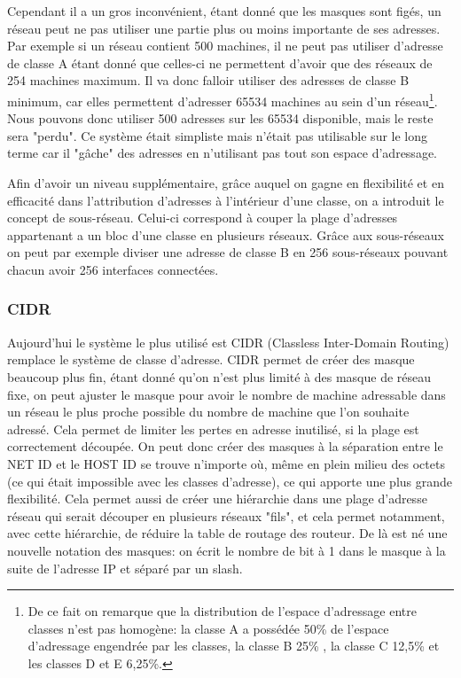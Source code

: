 Cependant il a un gros inconvénient, étant donné que les masques sont
figés, un réseau peut ne pas utiliser une partie plus ou moins importante
de ses adresses. Par exemple si un réseau contient 500 machines, il ne peut pas
utiliser d'adresse de classe A étant donné que celles-ci ne permettent d'avoir
que des réseaux de 254 machines maximum. Il va donc falloir utiliser des
adresses de classe B minimum, car elles permettent d'adresser 65534 machines au
sein d'un réseau\footnote{
De ce fait on remarque que la distribution de l’espace d’adressage entre
classes n'est pas homogène: la classe A a possédée 50\% de l’espace
d'adressage engendrée par les classes, la classe B 25\% , la classe C 12,5\%  et
les classes D et E 6,25\%.}. Nous pouvons donc utiliser 500 adresses sur les 65534
disponible, mais le reste sera "perdu".  Ce système était simpliste mais
n'était pas utilisable sur le long terme car il "gâche" des adresses en
n'utilisant pas tout son espace d'adressage.

Afin d'avoir un niveau supplémentaire, grâce auquel on gagne en flexibilité et
en efficacité dans l'attribution d'adresses à l'intérieur d'une classe, on a
introduit le concept de sous-réseau. Celui-ci correspond à couper la plage
d'adresses appartenant a un bloc d'une classe en plusieurs réseaux. Grâce aux
sous-réseaux on peut par exemple diviser une adresse de classe B en 256
sous-réseaux pouvant chacun avoir 256 interfaces connectées. 


\subsubsection{CIDR}

Aujourd'hui le système le plus utilisé est CIDR (Classless Inter-Domain
Routing) remplace le système de classe d'adresse. CIDR permet de créer des
masque beaucoup plus fin, étant donné qu'on n'est plus limité à des masque de
réseau fixe, on peut ajuster le masque pour avoir le nombre de machine
adressable dans un réseau le plus proche possible du nombre de machine que l'on
souhaite adressé.  Cela permet de limiter les pertes en adresse inutilisé, si
la plage est correctement découpée.  On peut donc créer des masques à la
séparation entre le NET ID et le HOST ID se trouve n'importe où, même en plein
milieu des octets (ce qui était impossible avec les classes d'adresse), ce qui
apporte une plus grande flexibilité.  Cela permet aussi de créer une hiérarchie
dans une plage d'adresse réseau qui serait découper en plusieurs réseaux
"fils", et cela permet notamment, avec cette hiérarchie, de réduire la table de
routage des routeur.  De là est né une nouvelle notation des masques: on écrit
le nombre de bit à 1 dans le masque à la suite de l'adresse IP et séparé par un
slash.


